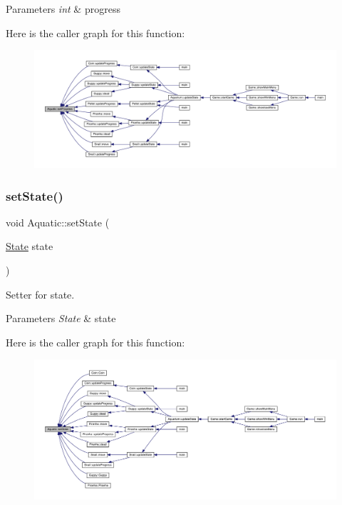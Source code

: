 \begin{DoxyParams}{Parameters}
{\em int} & progress \\
\hline
\end{DoxyParams}
Here is the caller graph for this function\+:
\nopagebreak
\begin{figure}[H]
\begin{center}
\leavevmode
\includegraphics[width=350pt]{class_aquatic_a56bd74d0814dd9ed13b395c0033eb594_icgraph}
\end{center}
\end{figure}
\mbox{\label{class_aquatic_a33de0f838d9a6f504cd8efeaa112b4ea}} 
\subsubsection{\texorpdfstring{set\+State()}{setState()}}
{\footnotesize\ttfamily void Aquatic\+::set\+State (\begin{DoxyParamCaption}\item[{\mbox{\hyperlink{_constants_8hpp_a5d74787dedbc4e11c1ab15bf487e61f8}{State}}}]{state }\end{DoxyParamCaption})}



Setter for state. 


\begin{DoxyParams}{Parameters}
{\em State} & state \\
\hline
\end{DoxyParams}
Here is the caller graph for this function\+:
\nopagebreak
\begin{figure}[H]
\begin{center}
\leavevmode
\includegraphics[width=350pt]{class_aquatic_a33de0f838d9a6f504cd8efeaa112b4ea_icgraph}
\end{center}
\end{figure}
\mbox{\label{class_aquatic_a4f5f9426805afd153c659cd0bb535ef6}} 
